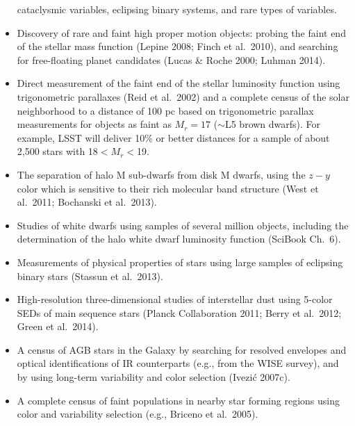 \begin{itemize}
          cataclysmic variables, eclipsing binary systems, and rare types of variables.
\item Discovery of rare and faint high proper motion objects: probing the
          faint end of the stellar mass function (Lepine 2008; Finch et al.~2010), and searching for
          free-floating planet candidates (Lucas \& Roche 2000; Luhman 2014).
\item Direct measurement of the faint end of the stellar luminosity function
          using trigonometric parallaxes (Reid et al.~2002) and a complete census of the
          solar neighborhood to a distance of 100 pc based on trigonometric parallax measurements for objects as faint as 
          $M_r=17$ ($\sim$L5 brown dwarfs). For example, LSST will deliver 10\% or better distances for a sample of about 2,500 stars
          with 18$<M_r<$19. %
\item The separation of halo M sub-dwarfs from disk M dwarfs, using the $z-y$ color which is sensitive to their rich molecular band 
          structure (West et al.~2011; Bochanski et al.~2013).
\item Studies of white dwarfs using samples of several million objects, including the determination of the halo white dwarf luminosity 
          function (SciBook Ch.~6). 
\item Measurements of physical properties of stars using large samples of eclipsing binary stars (Stassun et al.~2013). 
\item High-resolution three-dimensional studies of interstellar dust using 5-color
          SEDs of main sequence stars (Planck Collaboration 2011; Berry et al.~2012; Green et al.~2014).
\item A census of AGB stars in the Galaxy by searching for resolved envelopes and optical  identifications of IR counterparts
         (e.g., from the WISE survey), and by using long-term variability and color selection (Ivezi\'{c} 2007c).
\item A complete census of faint populations in nearby star forming regions using
          color and variability selection (e.g., Briceno et al.~2005).
\end{itemize}


